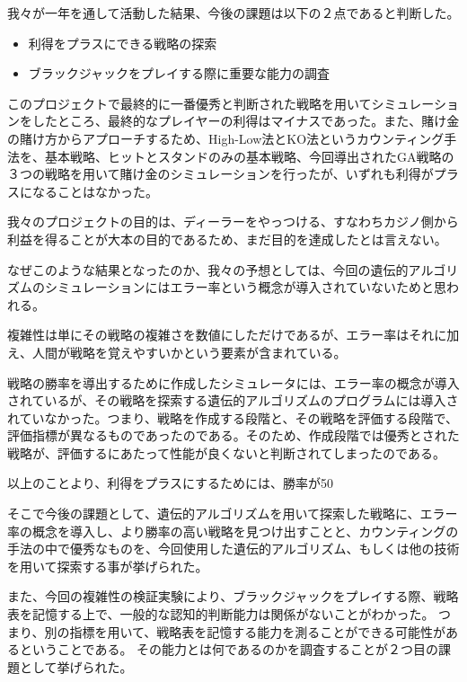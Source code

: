 我々が一年を通して活動した結果、今後の課題は以下の２点であると判断した。

\begin{itemize}
\item 利得をプラスにできる戦略の探索
\item ブラックジャックをプレイする際に重要な能力の調査
\end{itemize}

このプロジェクトで最終的に一番優秀と判断された戦略を用いてシミュレーションをしたところ、最終的なプレイヤーの利得はマイナスであった。また、賭け金の賭け方からアプローチするため、High-Low法とKO法というカウンティング手法を、基本戦略、ヒットとスタンドのみの基本戦略、今回導出されたGA戦略の３つの戦略を用いて賭け金のシミュレーションを行ったが、いずれも利得がプラスになることはなかった。

我々のプロジェクトの目的は、ディーラーをやっつける、すなわちカジノ側から利益を得ることが大本の目的であるため、まだ目的を達成したとは言えない。

なぜこのような結果となったのか、我々の予想としては、今回の遺伝的アルゴリズムのシミュレーションにはエラー率という概念が導入されていないためと思われる。

複雑性は単にその戦略の複雑さを数値にしただけであるが、エラー率はそれに加え、人間が戦略を覚えやすいかという要素が含まれている。

戦略の勝率を導出するために作成したシミュレータには、エラー率の概念が導入されているが、その戦略を探索する遺伝的アルゴリズムのプログラムには導入されていなかった。つまり、戦略を作成する段階と、その戦略を評価する段階で、評価指標が異なるものであったのである。そのため、作成段階では優秀とされた戦略が、評価するにあたって性能が良くないと判断されてしまったのである。

以上のことより、利得をプラスにするためには、勝率が50%

そこで今後の課題として、遺伝的アルゴリズムを用いて探索した戦略に、エラー率の概念を導入し、より勝率の高い戦略を見つけ出すことと、カウンティングの手法の中で優秀なものを、今回使用した遺伝的アルゴリズム、もしくは他の技術を用いて探索する事が挙げられた。

また、今回の複雑性の検証実験により、ブラックジャックをプレイする際、戦略表を記憶する上で、一般的な認知的判断能力は関係がないことがわかった。
つまり、別の指標を用いて、戦略表を記憶する能力を測ることができる可能性があるということである。
その能力とは何であるのかを調査することが２つ目の課題として挙げられた。

